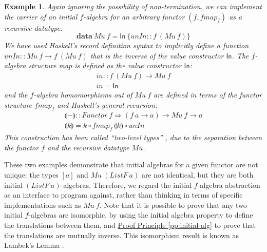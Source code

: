 \documentclass{jfp1}
\newcommand{\fold}[1]{\llparenthesis #1 \rrparenthesis}
\newtheorem{example}{Example}
\newcommand{\proofprinref}[1]{\hyperref[#1]{Proof Principle \ref*{#1}}}
\newcommand{\kw}[1]{\textbf{#1}}
\begin{document}
\begin{example}
  Again ignoring the possibility of non-termination, we can implement
  the carrier of an initial $f$-algebra for an arbitrary functor $(f,
  \mathit{fmap}_f)$ as a recursive datatype:
  \begin{equation}\label{eq:mu-defn}
    \kw{data}~\mathit{Mu}~f = \mathsf{In}~\{ \mathit{unIn} :: f~(\mathit{Mu}~f) \}
  \end{equation}
  We have used Haskell's record definition syntax to implicitly define
  a function $\mathit{unIn} :: \mathit{Mu}~f \to f~(\mathit{Mu}~f)$
  that is the inverse of the value constructor $\mathsf{In}$.  The
  $f$-algebra structure map is defined as the value
  constructor $\mathsf{In}$:
  \begin{displaymath}
    \begin{array}{l}
      \mathit{in} :: f~(\mathit{Mu}~f) \to \mathit{Mu}~f \\
      \mathit{in} = \mathsf{In}
    \end{array}
  \end{displaymath}
  and the $f$-algebra homomorphisms out of $\mathit{Mu}~f$ are defined
  in terms of the functor structure $\mathit{fmap}_f$ and Haskell's
  general recursion:
  \begin{displaymath}
    \begin{array}{l}
      \fold{-} :: \mathit{Functor}~f \Rightarrow (f~a \to a) \to \mathit{Mu}~f \to a \\
      \fold{k} = k \circ \mathit{fmap}_f~\fold{k} \circ \mathit{unIn}
    \end{array}
  \end{displaymath}
  This construction has been called ``two-level types''
  \cite{sheard04twolevel}, due to the separation between the functor
  $f$ and the recursive datatype $\mathit{Mu}$.
\end{example}

These two examples demonstrate that initial algebras for a given
functor are not unique: the types $[a]$ and
$\mathit{Mu}~(\mathit{ListF}~a)$ are not identical, but they are both
initial $(\mathit{ListF}~a)$-algebras. Therefore, we regard the
initial $f$-algebra abstraction as an interface to program against,
rather than thinking in terms of specific implementations such as
$\mathit{Mu}~f$. Note that it is possible to prove that any two
initial $f$-algebras are isomorphic, by using the initial algebra
property to define the translations between them, and
\proofprinref{pp:initial-alg} to prove that the translations are
mutually inverse. This isomorphism result is known as Lambek's Lemma
\cite{LAMBEK68}.
\end{document}
